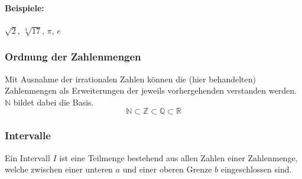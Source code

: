 \paragraph{Beispiele: } $\sqrt{2}$, $\sqrt[3]{17}$, $\pi$, $e$



\subsubsection{Ordnung der Zahlenmengen} 
Mit Ausnahme der irrationalen Zahlen können die (hier behandelten) Zahlenmengen als Erweiterungen der jeweils vorhergehenden verstanden werden. $\mathbb{N}$ bildet dabei die Basis.
\begin{equation*}
 \mathbb{N} \subset \mathbb{Z} \subset \mathbb{Q} \subset \mathbb{R}
\end{equation*}

\subsubsection{Intervalle}
Ein Intervall $I$ ist eine Teilmenge bestehend aus allen Zahlen einer Zahlenmenge, welche zwischen einer unteren $a$ und einer oberen Grenze $b$ eingeschlossen sind.
